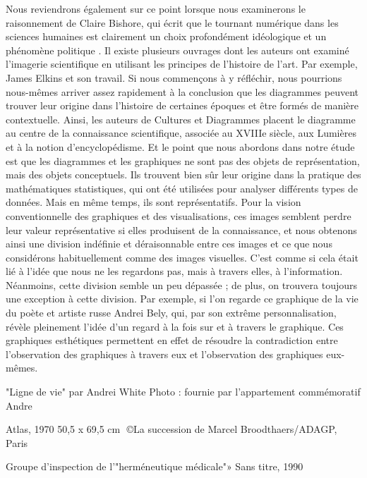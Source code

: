 \documentclass[a4paper, twoside, 12pt]{book}
\begin{document}
 Nous reviendrons également sur ce point lorsque nous examinerons le raisonnement de Claire Bishore, qui écrit que le tournant numérique dans les sciences humaines est clairement un choix profondément idéologique et un phénomène politique . Il existe plusieurs ouvrages dont les auteurs ont examiné l'imagerie scientifique en utilisant les principes de l'histoire de l'art. Par exemple, James Elkins et son travail. Si nous commençons à y réfléchir, nous pourrions nous-mêmes arriver assez rapidement à la conclusion que les diagrammes peuvent trouver leur origine dans l'histoire de certaines époques et être formés de manière contextuelle. Ainsi, les auteurs de Cultures et Diagrammes placent le diagramme au centre de la connaissance scientifique, associée au XVIIIe siècle, aux Lumières et à la notion d'encyclopédisme. Et le point que nous abordons dans notre étude est que les diagrammes et les graphiques ne sont pas des objets de représentation, mais des objets conceptuels. Ils trouvent bien sûr leur origine dans la pratique des mathématiques statistiques, qui ont été utilisées pour analyser différents types de données. Mais en même temps, ils sont représentatifs. Pour la vision conventionnelle des graphiques et des visualisations, ces images semblent perdre leur valeur représentative si elles produisent de la connaissance, et nous obtenons ainsi une division indéfinie et déraisonnable entre ces images et ce que nous considérons habituellement comme des images visuelles. C'est comme si cela était lié à l'idée que nous ne les regardons pas, mais à travers elles, à l'information. Néanmoins, cette division semble un peu dépassée ; de plus, on trouvera toujours une exception à cette division. Par exemple, si l'on regarde ce graphique de la vie du poète et artiste russe Andrei Bely, qui, par son extrême personnalisation, révèle pleinement l'idée d'un regard à la fois sur et à travers le graphique. 
Ces graphiques esthétiques permettent en effet de résoudre la contradiction entre l'observation des graphiques à travers eux et l'observation des graphiques eux-mêmes. 

"Ligne de vie" par Andrei White
Photo : fournie par l'appartement commémoratif Andre




Atlas, 1970
50,5 x 69,5 cm  ©La succession de Marcel Broodthaers/ADAGP, Paris







 Groupe d'inspection de l'"herméneutique médicale"»
Sans titre, 1990
\end{document}

